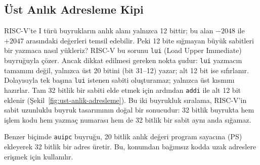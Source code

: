 \subsection{Üst Anlık Adresleme Kipi}
RISC-V'te I türü buyrukların anlık alanı yalnızca 12 bittir; bu alan $-2048$ ile $+2047$ arasındaki değerleri temsil edebilir. Peki 12 bite sığmayan büyük sabitleri bir yazmaca nasıl yükleriz? RISC-V bu sorunu \texttt{lui} (Load Upper Immediate) buyruğuyla çözer. Ancak dikkat edilmesi gereken nokta şudur: \texttt{lui} yazmacın tamamını değil, yalnızca üst 20 bitini (bit 31--12) yazar; alt 12 bit ise sıfırlanır. Dolayısıyla tek başına \texttt{lui} istenen sabiti oluşturamaz; yalnızca üst kısmını hazırlar. Tam 32 bitlik bir sabiti elde etmek için ardından \texttt{addi} ile alt 12 bit eklenir (Şekil~\ref{fig:ust-anlik-adresleme}). Bu iki buyrukluk sıralama, RISC-V'in sabit uzunluklu buyruk tasarımının doğal bir sonucudur: 32 bitlik buyrukta hem işlem kodu hem yazmaç numarası hem de 32 bitlik bir sabit aynı anda sığamaz.

Benzer biçimde \texttt{auipc} buyruğu, 20 bitlik anlık değeri program sayacına (PS) ekleyerek 32 bitlik bir adres üretir. Bu, konumdan bağımsız kodda uzak adreslere erişmek için kullanılır.

